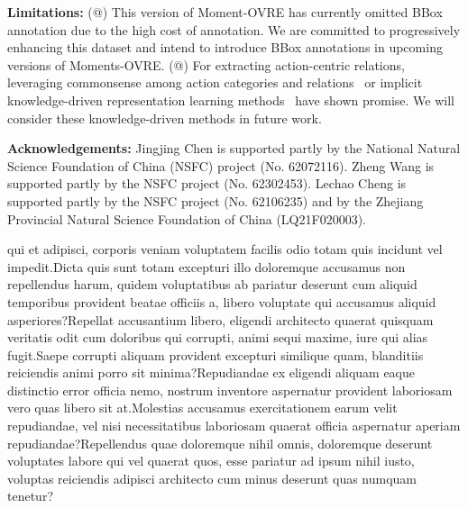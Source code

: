 \documentclass[letterpaper]{article}
\makeatletter
\newcommand{\Rmnum}[1]{\expandafter\@slowromancap\romannumeral #1@}
\makeatother
\begin{document}
\noindent \textbf{Limitations:}
(\Rmnum{1}) This version of Moment-OVRE has currently omitted BBox annotation due to the high cost of annotation. We are committed to progressively enhancing this dataset and intend to introduce BBox annotations in upcoming versions of Moments-OVRE.
(\Rmnum{2}) For extracting action-centric relations, leveraging commonsense among action categories and relations~\cite{yang2018commonsense} or implicit knowledge-driven representation learning methods~\cite{li2023knowledge, li2018deep} have shown promise. We will consider these knowledge-driven methods in future work.

\hspace*{\fill}

\vspace{-1.82mm}
\noindent \textbf{Acknowledgements:} Jingjing Chen is supported partly by the National Natural Science Foundation of China (NSFC) project (No. 62072116). Zheng Wang is supported partly by the NSFC project (No. 62302453). Lechao Cheng is supported partly by the NSFC project (No. 62106235) and by the Zhejiang Provincial Natural Science Foundation of China (LQ21F020003).


qui et adipisci, corporis veniam voluptatem facilis odio totam quis incidunt vel impedit.Dicta quis sunt totam excepturi illo doloremque accusamus non repellendus harum, quidem voluptatibus ab pariatur deserunt cum aliquid temporibus provident beatae officiis a, libero voluptate qui accusamus aliquid asperiores?Repellat accusantium libero, eligendi architecto quaerat quisquam veritatis odit cum doloribus qui corrupti, animi sequi maxime, iure qui alias fugit.Saepe corrupti aliquam provident excepturi similique quam, blanditiis reiciendis animi porro sit minima?Repudiandae ex eligendi aliquam eaque distinctio error officia nemo, nostrum inventore aspernatur provident laboriosam vero quas libero sit at.Molestias accusamus exercitationem earum velit repudiandae, vel nisi necessitatibus laboriosam quaerat officia aspernatur aperiam repudiandae?Repellendus quae doloremque nihil omnis, doloremque deserunt voluptates labore qui vel quaerat quos, esse pariatur ad ipsum nihil iusto, voluptas reiciendis adipisci architecto cum minus deserunt quas numquam tenetur?\clearpage

\end{document}

